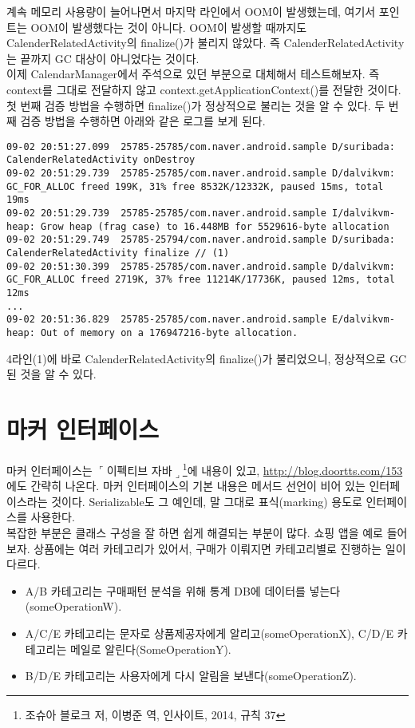 계속 메모리 사용량이 늘어나면서 마지막 라인에서 OOM이 발생했는데, 여기서 포인트는 OOM이 발생했다는 것이 아니다.
OOM이 발생할 때까지도 CalenderRelatedActivity의 finalize()가 불리지 않았다.
즉 CalenderRelatedActivity는 끝까지 GC 대상이 아니었다는 것이다.\\

이제 CalendarManager에서 주석으로 있던 부분으로 대체해서 테스트해보자.
즉 context를 그대로 전달하지 않고 context.getApplicationContext()를 전달한 것이다.
첫 번째 검증 방법을 수행하면 finalize()가 정상적으로 불리는 것을 알 수 있다.
두 번째 검증 방법을 수행하면 아래와 같은 로그를 보게 된다.
\begin{lstlisting}[frame=single]
09-02 20:51:27.099  25785-25785/com.naver.android.sample D/suribada: CalenderRelatedActivity onDestroy
09-02 20:51:29.739  25785-25785/com.naver.android.sample D/dalvikvm: GC_FOR_ALLOC freed 199K, 31% free 8532K/12332K, paused 15ms, total 19ms
09-02 20:51:29.739  25785-25785/com.naver.android.sample I/dalvikvm-heap: Grow heap (frag case) to 16.448MB for 5529616-byte allocation
09-02 20:51:29.749  25785-25794/com.naver.android.sample D/suribada: CalenderRelatedActivity finalize // (1)
09-02 20:51:30.399  25785-25785/com.naver.android.sample D/dalvikvm: GC_FOR_ALLOC freed 2719K, 37% free 11214K/17736K, paused 12ms, total 12ms
...
09-02 20:51:36.829  25785-25785/com.naver.android.sample E/dalvikvm-heap: Out of memory on a 176947216-byte allocation.
\end{lstlisting}
4라인(1)에 바로 CalenderRelatedActivity의 finalize()가 불리었으니, 정상적으로 GC된 것을 알 수 있다.

\section{마커 인터페이스}
마커 인터페이스는 $\ulcorner$이펙티브 자바$\lrcorner$\footnote{조슈아 블로크 저, 이병준 역, 인사이트, 2014, 규칙 37}에 내용이 있고, \url{http://blog.doortts.com/153}에도 간략히 나온다.
마커 인터페이스의 기본 내용은 메서드 선언이 비어 있는 인터페이스라는 것이다.
Serializable도 그 예인데, 말 그대로 표식(marking) 용도로 인터페이스를 사용한다.\\

복잡한 부분은 클래스 구성을 잘 하면 쉽게 해결되는 부분이 많다.
쇼핑 앱을 예로 들어보자. 상품에는 여러 카테고리가 있어서, 구매가 이뤄지면 카테고리별로 진행하는 일이 다르다.
\begin{itemize}
\item A/B 카테고리는 구매패턴 분석을 위해 통계 DB에 데이터를 넣는다(someOperationW).
\item A/C/E 카테고리는 문자로 상품제공자에게 알리고(someOperationX), C/D/E 카테고리는 메일로 알린다(SomeOperationY).
\item B/D/E 카테고리는 사용자에게 다시 알림을 보낸다(someOperationZ).
\end{itemize}

